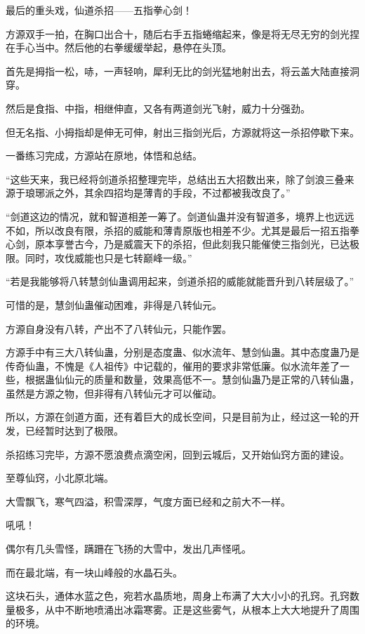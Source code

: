 \begin{this_body}
最后的重头戏，仙道杀招——五指拳心剑！

方源双手一拍，在胸口出合十，随后右手五指蜷缩起来，像是将无尽无穷的剑光捏在手心当中。然后他的右拳缓缓举起，悬停在头顶。

首先是拇指一松，哧，一声轻响，犀利无比的剑光猛地射出去，将云盖大陆直接洞穿。

然后是食指、中指，相继伸直，又各有两道剑光飞射，威力十分强劲。

但无名指、小拇指却是伸无可伸，射出三指剑光后，方源就将这一杀招停歇下来。

一番练习完成，方源站在原地，体悟和总结。

“这些天来，我已经将剑道杀招整理完毕，总结出五大招数出来，除了剑浪三叠来源于琅琊派之外，其余四招均是薄青的手段，不过都被我改良了。”

“剑道这边的情况，就和智道相差一筹了。剑道仙蛊并没有智道多，境界上也远远不如，所以改良有限，杀招的威能和薄青原版也相差不少。尤其是最后一招五指拳心剑，原本享誉古今，乃是威震天下的杀招，但此刻我只能催使三指剑光，已达极限。同时，攻伐威能也只是七转巅峰一级。”

“若是我能够将八转慧剑仙蛊调用起来，剑道杀招的威能就能晋升到八转层级了。”

可惜的是，慧剑仙蛊催动困难，非得是八转仙元。

方源自身没有八转，产出不了八转仙元，只能作罢。

方源手中有三大八转仙蛊，分别是态度蛊、似水流年、慧剑仙蛊。其中态度蛊乃是传奇仙蛊，不愧是《人祖传》中记载的，催用的要求非常低廉。似水流年差了一些，根据蛊仙仙元的质量和数量，效果高低不一。慧剑仙蛊乃是正常的八转仙蛊，虽然是方源之物，但非得有八转仙元才可以催动。

所以，方源在剑道方面，还有着巨大的成长空间，只是目前为止，经过这一轮的开发，已经暂时达到了极限。

杀招练习完毕，方源不愿浪费点滴空闲，回到云城后，又开始仙窍方面的建设。

至尊仙窍，小北原北端。

大雪飘飞，寒气四溢，积雪深厚，气度方面已经和之前大不一样。

吼吼！

偶尔有几头雪怪，蹒跚在飞扬的大雪中，发出几声怪吼。

而在最北端，有一块山峰般的水晶石头。

这块石头，通体水蓝之色，宛若水晶质地，周身上布满了大大小小的孔窍。孔窍数量极多，从中不断地喷涌出冰霜寒雾。正是这些雾气，从根本上大大地提升了周围的环境。


\end{this_body}
